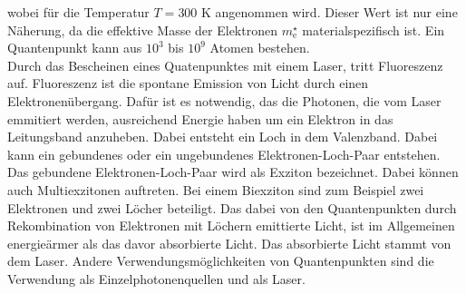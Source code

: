  wobei für die Temperatur $T=300$ K angenommen wird. Dieser Wert ist nur eine Näherung, da die effektive Masse der Elektronen $m_{\mathrm{e}}^\star$ materialspezifisch ist. Ein Quantenpunkt kann aus $10^3$ bis $10^9$ Atomen bestehen. \\
 Durch das Bescheinen eines Quatenpunktes mit einem Laser, tritt Fluoreszenz auf. Fluoreszenz ist die spontane Emission von Licht durch einen Elektronenübergang. Dafür ist es notwendig, das die Photonen, die vom Laser emmitiert werden, ausreichend  Energie haben um ein Elektron in das Leitungsband anzuheben. Dabei entsteht ein Loch in dem Valenzband. Dabei kann ein gebundenes oder ein ungebundenes Elektronen-Loch-Paar entstehen. 
 Das gebundene Elektronen-Loch-Paar wird als Exziton bezeichnet. Dabei können auch Multiexzitonen auftreten. Bei einem Biexziton sind zum Beispiel zwei Elektronen und zwei Löcher beteiligt. 
 Das dabei von den Quantenpunkten durch Rekombination von Elektronen mit Löchern emittierte Licht, ist im Allgemeinen energieärmer als das davor absorbierte Licht. Das absorbierte Licht stammt von dem Laser. 
 Andere Verwendungsmöglichkeiten von  Quantenpunkten sind die Verwendung als Einzelphotonenquellen und als Laser. 
